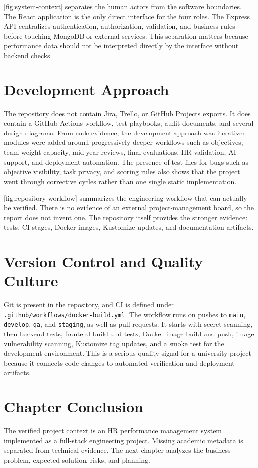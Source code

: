 

\cref{fig:system-context} separates the human actors from the software boundaries. The React application is the only direct interface for the four roles. The Express API centralizes authentication, authorization, validation, and business rules before touching MongoDB or external services. This separation matters because performance data should not be interpreted directly by the interface without backend checks.

\section{Development Approach}
The repository does not contain Jira, Trello, or GitHub Projects exports. It does contain a GitHub Actions workflow, test playbooks, audit documents, and several design diagrams. From code evidence, the development approach was iterative: modules were added around progressively deeper workflows such as objectives, team weight capacity, mid-year reviews, final evaluations, HR validation, AI support, and deployment automation. The presence of test files for bugs such as objective visibility, task privacy, and scoring rules also shows that the project went through corrective cycles rather than one single static implementation.



\cref{fig:repository-workflow} summarizes the engineering workflow that can actually be verified. There is no evidence of an external project-management board, so the report does not invent one. The repository itself provides the stronger evidence: tests, CI stages, Docker images, Kustomize updates, and documentation artifacts.

\section{Version Control and Quality Culture}
Git is present in the repository, and CI is defined under \texttt{.github/workflows/docker-build.yml}. The workflow runs on pushes to \texttt{main}, \texttt{develop}, \texttt{qa}, and \texttt{staging}, as well as pull requests. It starts with secret scanning, then backend tests, frontend build and tests, Docker image build and push, image vulnerability scanning, Kustomize tag updates, and a smoke test for the development environment. This is a serious quality signal for a university project because it connects code changes to automated verification and deployment artifacts.

\section{Chapter Conclusion}
The verified project context is an HR performance management system implemented as a full-stack engineering project. Missing academic metadata is separated from technical evidence. The next chapter analyzes the business problem, expected solution, risks, and planning.
